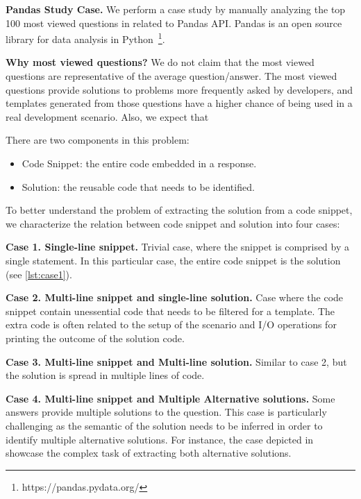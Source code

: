 


\textbf{Pandas Study Case.}
We perform a case study by manually analyzing the top 100 most viewed questions in \stackoverflow related to Pandas API.
Pandas is an open source library for data analysis in Python~\footnote{https://pandas.pydata.org/}.

\textbf{Why most viewed questions?}
We do not claim that the most viewed questions are representative of the average \stackoverflow question/answer.
The most viewed questions provide solutions to problems more frequently asked by developers, and templates generated from those questions have a higher chance of being used in a real development scenario.
Also, we expect that 

There are two components in this problem:
\begin{itemize}
	\item Code Snippet: the entire code embedded in a \stackoverflow response.
    \item Solution: the reusable code that needs to be identified. 
\end{itemize}

To better understand the problem of extracting the solution from a code snippet, we characterize the relation between code snippet and solution into four cases:


\textbf{Case 1. Single-line snippet.}  
Trivial case, where the snippet is comprised by a single statement. 
In this particular case, the entire code snippet is the solution (see \ref{lst:case1}).


\textbf{Case 2. Multi-line snippet and single-line solution.}
Case where the code snippet contain unessential code that needs to be filtered for a template. 
The extra code is often related to the setup of the scenario and I/O operations for printing the outcome of the solution code. 

\textbf{Case 3. Multi-line snippet and Multi-line solution.}
Similar to case 2, but the solution is spread in multiple lines of code.

\textbf{Case 4. Multi-line snippet and Multiple Alternative solutions.}
Some \stackoverflow answers provide multiple solutions to the question.
This case is particularly challenging as the semantic of the solution needs to be inferred in order to identify multiple alternative solutions.
For instance, the case depicted in~ showcase the complex task of extracting both alternative solutions.

